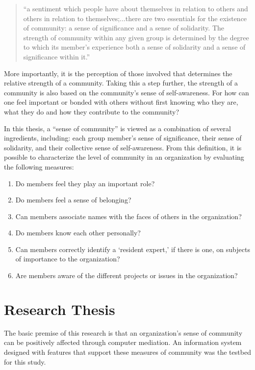 \begin{quote}
  ``a sentiment which people have about themselves in relation to others and
  others in relation to themselves;...there are two essentials for the
  existence of community: a sense of significance and a sense of solidarity.
  The strength of community within any given group is determined by the
  degree to which its member's experience both a sense of solidarity and a
  sense of significance within it.''
\end{quote}

More importantly, it is the perception of those involved that determines the
relative strength of a community.  Taking this a step further, the strength of
a community is also based on the community's sense of self-awareness.  For how
can one feel important or bonded with others without first knowing who they
are, what they do and how they contribute to the community?

In this thesis, a ``sense of community'' is viewed as a combination of several
ingredients, including: each group member's sense of significance, their sense
of solidarity, and their collective sense of self-awareness.  From this
definition, it is possible to characterize the level of community in an
organization by evaluating the following measures:

\begin{enumerate}
\item{Do members feel they play an important role?}
\item{Do members feel a sense of belonging?}
\item{Can members associate names with the faces of others in the
  organization?}
\item{Do members know each other personally?}
\item{Can members correctly identify a `resident expert,' if there is one, on
  subjects of importance to the organization?}
\item{Are members aware of the different projects or issues in the
  organization?}
\end{enumerate}

\section{Research Thesis}
The basic premise of this research is that an organization's sense of community
can be positively affected through computer mediation.  An information system
designed with features that support these measures of community was the testbed
for this study.

